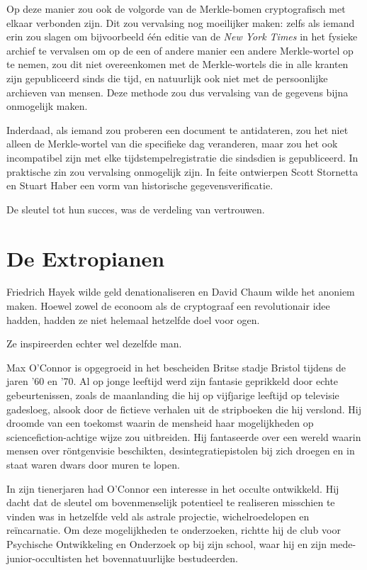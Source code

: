 \documentclass[smalldemyvopaper,11pt,twoside,onecolumn,openright,extrafontsizes,hidelinks]{memoir}
\begin{document}
Op deze manier zou ook de volgorde van de Merkle-bomen cryptografisch
met elkaar verbonden zijn. Dit zou vervalsing nog moeilijker maken:
zelfs als iemand erin zou slagen om bijvoorbeeld één editie van de
\emph{New York Times} in het fysieke archief te vervalsen om op de een
of andere manier een andere Merkle-wortel op te nemen, zou dit niet
overeenkomen met de Merkle-wortels die in alle kranten zijn gepubliceerd
sinds die tijd, en natuurlijk ook niet met de persoonlijke archieven van
mensen. Deze methode zou dus vervalsing van de gegevens bijna onmogelijk
maken.

Inderdaad, als iemand zou proberen een document te antidateren, zou het
niet alleen de Merkle-wortel van die specifieke dag veranderen, maar zou
het ook incompatibel zijn met elke tijdstempelregistratie die sindsdien
is gepubliceerd. In praktische zin zou vervalsing onmogelijk zijn. In
feite ontwierpen Scott Stornetta en Stuart Haber een vorm van
historische gegevensverificatie.

De sleutel tot hun succes, was de verdeling van vertrouwen.

\chapter{De Extropianen}\label{de-extropianen}

Friedrich Hayek wilde geld denationaliseren en David Chaum wilde het
anoniem maken. Hoewel zowel de econoom als de cryptograaf een
revolutionair idee hadden, hadden ze niet helemaal hetzelfde doel voor
ogen.

Ze inspireerden echter wel dezelfde man.

Max O'Connor is opgegroeid in het bescheiden Britse stadje Bristol
tijdens de jaren '60 en '70. Al op jonge leeftijd werd zijn fantasie
geprikkeld door echte gebeurtenissen, zoals de maanlanding die hij op
vijfjarige leeftijd op televisie gadesloeg, alsook door de fictieve
verhalen uit de stripboeken die hij verslond. Hij droomde van een
toekomst waarin de mensheid haar mogelijkheden op sciencefiction-achtige
wijze zou uitbreiden. Hij fantaseerde over een wereld waarin mensen over
röntgenvisie beschikten, desintegratiepistolen bij zich droegen en in
staat waren dwars door muren te lopen.

In zijn tienerjaren had O'Connor een interesse in het occulte
ontwikkeld. Hij dacht dat de sleutel om bovenmenselijk potentieel te
realiseren misschien te vinden was in hetzelfde veld als astrale
projectie, wichelroedelopen en reïncarnatie. Om deze mogelijkheden te
onderzoeken, richtte hij de club voor Psychische Ontwikkeling en
Onderzoek op bij zijn school, waar hij en zijn mede-junior-occultisten
het bovennatuurlijke bestudeerden.
\end{document}
